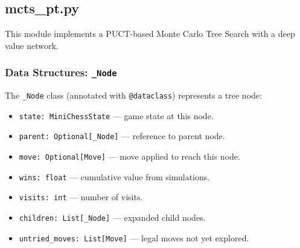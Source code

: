 \documentclass{report}
\begin{document}
\subsection{mcts\_pt.py}
\label{sec:mcts_pt}
This module implements a PUCT-based Monte Carlo Tree Search with a deep value network.

\subsubsection{Data Structures: \texttt{\_Node}}
The \texttt{\_Node} class (annotated with \texttt{@dataclass}) represents a tree node:
\begin{itemize}
  \item \texttt{state: MiniChessState} — game state at this node.
  \item \texttt{parent: Optional[\_Node]} — reference to parent node.
  \item \texttt{move: Optional[Move]} — move applied to reach this node.
  \item \texttt{wins: float} — cumulative value from simulations.
  \item \texttt{visits: int} — number of visits.
  \item \texttt{children: List[\_Node]} — expanded child nodes.
  \item \texttt{untried\_moves: List[Move]} — legal moves not yet explored.
\end{itemize}
\end{document}
